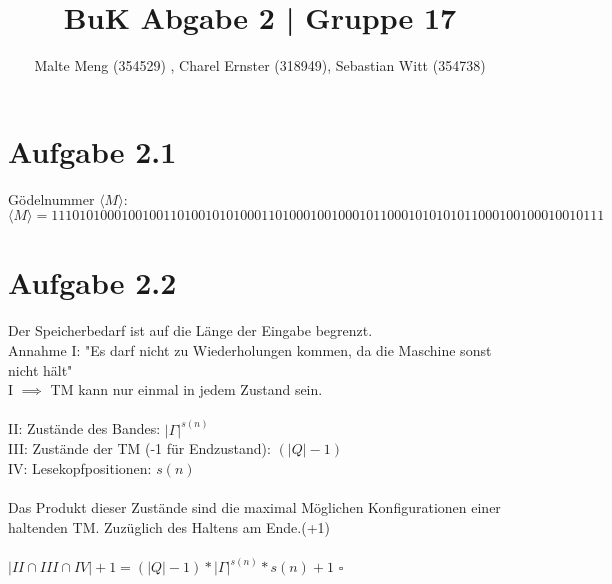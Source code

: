 \documentclass{article}
\title{BuK Abgabe 2 | Gruppe 17}
\author{Malte Meng (354529) , Charel Ernster (318949), Sebastian Witt (354738)}
\begin{document}
	\maketitle 
	\section[a 2.1]{Aufgabe 2.1}
	Gödelnummer $\langle M\rangle$:\\
	$\langle M\rangle = 111 0101000100100 11 010010101000 11 01000100100010 11 00010101010 11 000100100010010 111 $
	\section[a 2.2]{Aufgabe 2.2}
	Der Speicherbedarf ist auf die Länge der Eingabe begrenzt.\\
	Annahme I: "Es darf nicht zu Wiederholungen kommen, da die Maschine sonst nicht hält"\\
	I $\implies$ TM kann nur einmal in jedem Zustand sein.\\\\
	II: Zustände des Bandes: $|\Gamma|^{s(n)}$ \\
	III: Zustände der TM (-1 für Endzustand): $(|Q| - 1)$\\
	IV: Lesekopfpositionen: $s(n)$\\\\
	Das Produkt dieser Zustände sind die maximal Möglichen Konfigurationen einer haltenden TM. Zuzüglich des Haltens am Ende.(+1)\\\\
	$|II \cap III \cap IV| +1 = (|Q| - 1) * |\Gamma|^{s(n)} * s(n)+1$
	\quad$\square$\\
\end{document}
